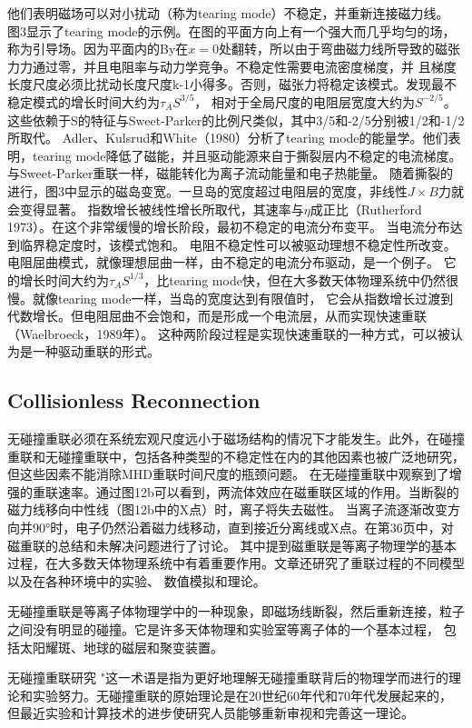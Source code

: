 \documentclass[12pt, a4paper, oneside]{article}
\begin{document}
\begin{spacing}{2.0}
他们表明磁场可以对小扰动（称为tearing mode）不稳定，并重新连接磁力线。
图3显示了tearing mode的示例。在图的平面方向上有一个强大而几乎均匀的场，
称为引导场。因为平面内的By在$x = 0$处翻转，所以由于弯曲磁力线所导致的磁张力力通过零，并且电阻率与动力学竞争。不稳定性需要电流密度梯度，并
且梯度长度尺度必须比扰动长度尺度k-1小得多。否则，磁张力将稳定该模式。发现最不稳定模式的增长时间大约为$\tau_AS^{3/5}$，
相对于全局尺度的电阻层宽度大约为$S^{-2/5}$。
这些依赖于S的特征与Sweet-Parker的比例尺类似，其中3/5和-2/5分别被1/2和-1/2所取代。
Adler、Kulsrud和White（1980）分析了tearing mode的能量学。他们表明，tearing mode降低了磁能，并且驱动能源来自于撕裂层内不稳定的电流梯度。
与Sweet-Parker重联一样，磁能转化为离子流动能量和电子热能量。
随着撕裂的进行，图3中显示的磁岛变宽。一旦岛的宽度超过电阻层的宽度，非线性$J\times B$力就会变得显著。
指数增长被线性增长所取代，其速率与$\eta$成正比（Rutherford 1973）。在这个非常缓慢的增长阶段，最初不稳定的电流分布变平。
当电流分布达到临界稳定度时，该模式饱和。
电阻不稳定性可以被驱动理想不稳定性所改变。电阻屈曲模式，就像理想屈曲一样，由不稳定的电流分布驱动，是一个例子。
它的增长时间大约为$\tau_AS^{1/3}$，比tearing mode快，但在大多数天体物理系统中仍然很慢。就像tearing mode一样，当岛的宽度达到有限值时，
它会从指数增长过渡到代数增长。但电阻屈曲不会饱和，而是形成一个电流层，从而实现快速重联（Waelbroeck，1989年）。
这种两阶段过程是实现快速重联的一种方式，可以被认为是一种驱动重联的形式。
\subsection{Collisionless Reconnection}
无碰撞重联必须在系统宏观尺度远小于磁场结构的情况下才能发生。此外，在碰撞重联和无碰撞重联中，包括各种类型的不稳定性在内的其他因素也被广泛地研究，
但这些因素不能消除MHD重联时间尺度的瓶颈问题。
在无碰撞重联中观察到了增强的重联速率。通过图12b可以看到，两流体效应在磁重联区域的作用。当断裂的磁力线移向中性线（图12b中的X点）时，离子将失去磁性。
当离子流逐渐改变方向并90°时，电子仍然沿着磁力线移动，直到接近分离线或X点。在第36页中，对磁重联的总结和未解决问题进行了讨论。
其中提到磁重联是等离子物理学的基本过程，在大多数天体物理系统中有着重要作用。文章还研究了重联过程的不同模型以及在各种环境中的实验、
数值模拟和理论。

无碰撞重联是等离子体物理学中的一种现象，即磁场线断裂，然后重新连接，粒子之间没有明显的碰撞。它是许多天体物理和实验室等离子体的一个基本过程，
包括太阳耀斑、地球的磁层和聚变装置。

无碰撞重联研究 "这一术语是指为更好地理解无碰撞重联背后的物理学而进行的理论和实验努力。无碰撞重联的原始理论是在20世纪60年代和70年代发展起来的，
但最近实验和计算技术的进步使研究人员能够重新审视和完善这一理论。


\end{spacing}
\end{document}
